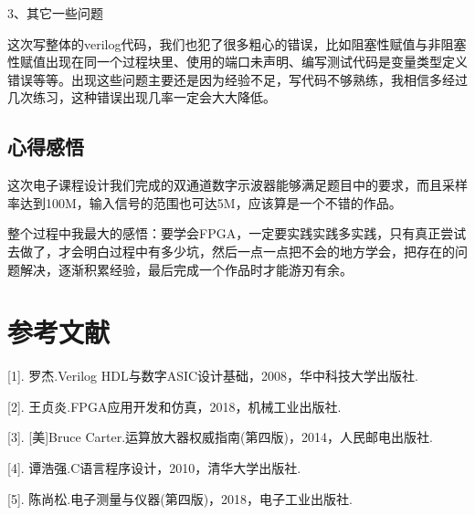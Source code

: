 \documentclass[supercite]{HustGraduPaper}
\begin{document}
	3、其它一些问题
	
	这次写整体的verilog代码，我们也犯了很多粗心的错误，比如阻塞性赋值与非阻塞性赋值出现在同一个过程块里、使用的端口未声明、编写测试代码是变量类型定义错误等等。出现这些问题主要还是因为经验不足，写代码不够熟练，我相信多经过几次练习，这种错误出现几率一定会大大降低。
	
	
	\subsection{心得感悟}
	这次电子课程设计我们完成的双通道数字示波器能够满足题目中的要求，而且采样率达到100M，输入信号的范围也可达5M，应该算是一个不错的作品。
	
	整个过程中我最大的感悟：要学会FPGA，一定要实践实践多实践，只有真正尝试去做了，才会明白过程中有多少坑，然后一点一点把不会的地方学会，把存在的问题解决，逐渐积累经验，最后完成一个作品时才能游刃有余。
	
	
	
	
	\section{参考文献}\label{sec:ref}
	
	[1].	罗杰.Verilog HDL与数字ASIC设计基础，2008，华中科技大学出版社.
	
	[2].	王贞炎.FPGA应用开发和仿真，2018，机械工业出版社.
	
	[3].	[美]Bruce Carter.运算放大器权威指南(第四版)，2014，人民邮电出版社.
	
	[4].	谭浩强.C语言程序设计，2010，清华大学出版社.
	
	[5].	陈尚松.电子测量与仪器(第四版)，2018，电子工业出版社.
	
	
\end{document}
